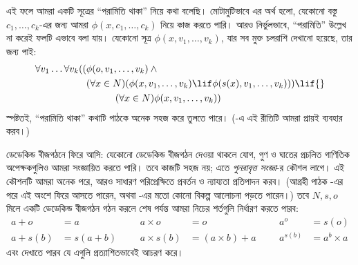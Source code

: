 \documentclass[../../../include/open-logic-section]{subfiles}
\begin{document}
এই ফলে আমরা একটি সূত্রের ``পরামিতি থাকা'' নিয়ে কথা বলেছি। মোটামুটিভাবে এর অর্থ হলো, যেকোনো বস্তু $c_1, \ldots, c_k$-এর জন্য আমরা $\phi(x, c_1, \ldots, c_k)$ নিয়ে কাজ করতে পারি। আরও নির্ভুলভাবে, ``পরামিতি'' উল্লেখ না করেই ফলটি এভাবে বলা যায়। যেকোনো সূত্র $\phi(x, v_1, \ldots, v_k)$, যার সব মুক্ত চলরাশি দেখানো হয়েছে, তার জন্য পাই:
	\begin{align*}
			\forall v_1 \ldots \forall v_k((&\phi(o, v_1,\ldots, v_k) \land {}\\
			&	(\forall x \in N)(\phi(x,v_1, \ldots, v_k) \lif \phi(s(x), v_1,\ldots, v_k))) \lif {}\\
			&\hspace{3em} (\forall x \in N)\phi(x, v_1,\ldots, v_k))
	\end{align*}
স্পষ্টতই, ``পরামিতি থাকা'' কথাটি পাঠকে অনেক সহজ করে তুলতে পারে। (-এ এই রীতিটি আমরা প্রায়ই ব্যবহার করব।)

ডেডেকিন্ড বীজগঠনে ফিরে আসি: যেকোনো ডেডেকিন্ড বীজগঠন দেওয়া থাকলে যোগ, গুণ ও ঘাতের প্রচলিত গাণিতিক অপেক্ষকগুলিও আমরা সংজ্ঞায়িত করতে পারি। তবে কাজটি সহজ নয়; এতে \emph{পুনরাবৃত্ত সংজ্ঞা}-র কৌশল লাগে। এই কৌশলটি আমরা অনেক পরে, আরও সাধারণ পরিপ্রেক্ষিতে প্রবর্তন ও ন্যায্যতা প্রতিপাদন করব। (আগ্রহী পাঠক -এর পরে এই অংশে ফিরে আসতে পারেন, অথবা \citealt[pp.~95--8]{Potter2004}-এর মতো কোনো বিকল্প আলোচনা পড়তে পারেন।) তবে $N, s, o$ মিলে একটি ডেডেকিন্ড বীজগঠন গঠন করলে শেষ পর্যন্ত আমরা নিচের শর্তগুলি নির্ধারণ করতে পারব:
\begin{align*}
	{a} + {o} &= {a} & & & {a} \times {o} &= {o} & & & {a}^{o} &= s(o)\\
{a} + {s}({b}) &= {s}({a}+{b}) &&& {a} \times {s}({b}) &= ({a}\times {b}) + {a}  & & & {a}^{{s}({b})} &= {a}^{b} \times {a}
\end{align*}
এবং দেখাতে পারব যে এগুলি প্রত্যাশিতভাবেই আচরণ করে।
\end{document}
